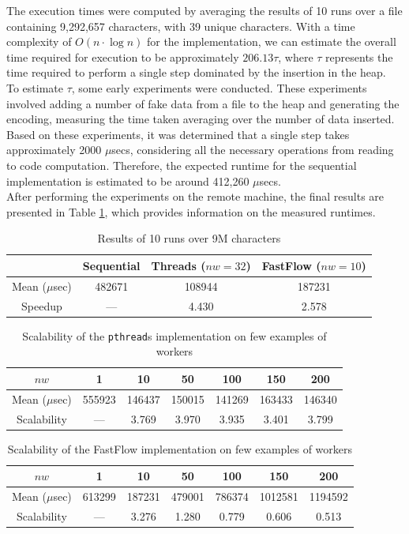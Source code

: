 \documentclass[10pt]{article}
\begin{document}
The execution times were computed by averaging the results of 10 runs over a file containing 9,292,657 characters, with 39 unique characters. With a time complexity of $O(n\cdot\log n)$ for the implementation, we can estimate the overall time required for execution to be approximately $206.13\tau$, where $\tau$ represents the time required to perform a single step dominated by the insertion in the heap.\\
To estimate $\tau$, some early experiments were conducted. These experiments involved adding a number of fake data from a file to the heap and generating the encoding, measuring the time taken averaging over the number of data inserted. Based on these experiments, it was determined that a single step takes approximately 2000 $\mu$secs, considering all the necessary operations from reading to code computation. Therefore, the expected runtime for the sequential implementation is estimated to be around 412,260 $\mu$secs.\\
After performing the experiments on the remote machine, the final results are presented in Table \ref{table:experiments}, which provides information on the measured runtimes.
\begin{table}[H]
\begin{center}
	\begin{tabular}{c || c | c | c}
	& Sequential & Threads ($nw = 32$) & FastFlow ($nw = 10$)\\
	\hline
	Mean ($\mu$sec) & 482671 & 108944 & 187231 \\
	\hline
	Speedup & --- & 4.430 & 2.578
	\end{tabular}
\end{center}
\caption{Results of 10 runs over 9M characters}
\label{table:experiments}
\end{table}
\begin{table}[H]
\begin{center}
	\begin{tabular}{c || c c c c c c}
	$nw$ & 1 & 10 & 50 & 100 & 150 & 200\\
	\hline
	Mean ($\mu$sec) & 555923 & 146437 & 150015 & 141269 & 163433 & 146340\\
	\hline
	Scalability & --- & 3.769 & 3.970 & 3.935 & 3.401 & 3.799
	\end{tabular}
\end{center}
\caption{Scalability of the \texttt{pthread}s implementation on few examples of workers}
\label{table:scalability_threads}
\end{table}
\begin{table}[H]
\begin{center}
	\begin{tabular}{c || c c c c c c}
	$nw$ & 1 & 10 & 50 & 100 & 150 & 200\\
	\hline
	Mean ($\mu$sec) & 613299 & 187231 & 479001 & 786374 & 1012581 & 1194592\\
	\hline
	Scalability & --- & 3.276 & 1.280 & 0.779 & 0.606 & 0.513
	\end{tabular}
\end{center}
\caption{Scalability of the FastFlow implementation on few examples of workers}
\label{table:scalability_fastflow}
\end{table}
\end{document}
